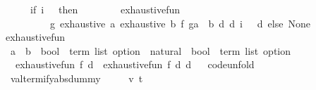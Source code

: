 \begin{isabellebody}
\ \ \ \ \ \ {\isacharparenleft}{\kern0pt}if\ i\ {\isachargreater}{\kern0pt}\ {}\ then\isanewline
\ \ \ \ \ \ \ \ exhaustive{\isacharunderscore}{\kern0pt}fun{\isacharprime}{\kern0pt}\isanewline
\ \ \ \ \ \ \ \ \ \ {\isacharparenleft}{\kern0pt}{\isasymlambda}g{\isachardot}{\kern0pt}\ exhaustive\ {\isacharparenleft}{\kern0pt}{\isasymlambda}a{\isachardot}{\kern0pt}\ exhaustive\ {\isacharparenleft}{\kern0pt}{\isasymlambda}b{\isachardot}{\kern0pt}\ f\ {\isacharparenleft}{\kern0pt}g{\isacharparenleft}{\kern0pt}a\ {\isacharcolon}{\kern0pt}{\isacharequal}{\kern0pt}\ b{\isacharparenright}{\kern0pt}{\isacharparenright}{\kern0pt}{\isacharparenright}{\kern0pt}\ d{\isacharparenright}{\kern0pt}\ d{\isacharparenright}{\kern0pt}\ {\isacharparenleft}{\kern0pt}i\ {\isacharminus}{\kern0pt}\ {}{\isacharparenright}{\kern0pt}\ d\ else\ None{\isacharparenright}{\kern0pt}{\isachardoublequoteclose}\isanewline
\isanewline
{}\isamarkupfalse%
\ exhaustive{\isacharunderscore}{\kern0pt}fun\ {\isacharcolon}{\kern0pt}{\isacharcolon}{\kern0pt}\isanewline
\ \ {\isachardoublequoteopen}{\isacharparenleft}{\kern0pt}{\isacharparenleft}{\kern0pt}{\isacharprime}{\kern0pt}a\ {\isasymRightarrow}\ {\isacharprime}{\kern0pt}b{\isacharparenright}{\kern0pt}\ {\isasymRightarrow}\ {\isacharparenleft}{\kern0pt}bool\ {\isasymtimes}\ term\ list{\isacharparenright}{\kern0pt}\ option{\isacharparenright}{\kern0pt}\ {\isasymRightarrow}\ natural\ {\isasymRightarrow}\ {\isacharparenleft}{\kern0pt}bool\ {\isasymtimes}\ term\ list{\isacharparenright}{\kern0pt}\ option{\isachardoublequoteclose}\isanewline
\ \ \ {\isachardoublequoteopen}exhaustive{\isacharunderscore}{\kern0pt}fun\ f\ d\ {\isacharequal}{\kern0pt}\ exhaustive{\isacharunderscore}{\kern0pt}fun{\isacharprime}{\kern0pt}\ f\ d\ d{\isachardoublequoteclose}\isanewline
\isanewline
{}\isamarkupfalse%
%
\isadelimproof
\ %
\endisadelimproof
%
\isatagproof
\isacommand{{\isachardot}{\kern0pt}{\isachardot}{\kern0pt}}\isamarkupfalse%
%
\endisatagproof
{\isafoldproof}%
%
\isadelimproof
%
\endisadelimproof
\isanewline
\isanewline
{}\isamarkupfalse%
\isanewline
\isanewline
{}\isamarkupfalse%
\ {\isacharbrackleft}{\kern0pt}code{\isacharunderscore}{\kern0pt}unfold{\isacharbrackright}{\kern0pt}{\isacharcolon}{\kern0pt}\isanewline
\ \ {\isachardoublequoteopen}valtermify{\isacharunderscore}{\kern0pt}absdummy\ {\isacharequal}{\kern0pt}\isanewline
\ \ \ \ {\isacharparenleft}{\kern0pt}{\isasymlambda}{\isacharparenleft}{\kern0pt}v{\isacharcomma}{\kern0pt}\ t{\isacharparenright}{\kern0pt}{\isachardot}{\kern0pt}\isanewline

\end{isabellebody}
